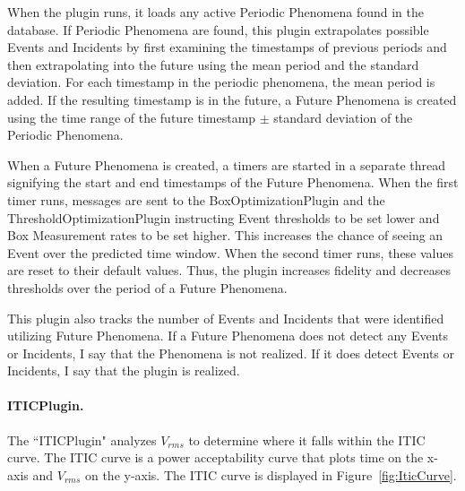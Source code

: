 When the plugin runs, it loads any active Periodic Phenomena found in the database. If Periodic Phenomena are found, this plugin extrapolates possible Events and Incidents by first examining the timestamps of previous periods and then extrapolating into the future using the mean period and the standard deviation. For each timestamp in the periodic phenomena, the mean period is added. If the resulting timestamp is in the future, a Future Phenomena is created using the time range of the future timestamp $\pm$ standard deviation of the Periodic Phenomena.

When a Future Phenomena is created, a timers are started in a separate thread signifying the start and end timestamps of the Future Phenomena. When the first timer runs, messages are sent to the BoxOptimizationPlugin and the ThresholdOptimizationPlugin instructing Event thresholds to be set lower and Box Measurement rates to be set higher. This increases the chance of seeing an Event over the predicted time window. When the second timer runs, these values are reset to their default values. Thus, the plugin increases fidelity and decreases thresholds over the period of a Future Phenomena.

This plugin also tracks the number of Events and Incidents that were identified utilizing Future Phenomena. If a Future Phenomena does not detect any Events or Incidents, I say that the Phenomena is not realized. If it does detect Events or Incidents, I say that the plugin is realized.

\paragraph{ITICPlugin.}
The ``ITICPlugin" analyzes $V_{rms}$ to determine where it falls within the ITIC curve\cite{thallam2000power}. The ITIC curve is a power acceptability curve that plots time on the x-axis and $V_{rms}$ on the y-axis. The ITIC curve is displayed in Figure~\ref{fig:IticCurve}.


